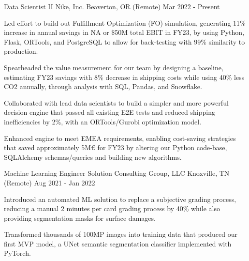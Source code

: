 


\begin{cventries}


\cventry
{Data Scientist II} %
{Nike, Inc.} %
{Beaverton, OR (Remote)} %
{Mar 2022 - Present} %
{ %
\begin{cvitems}
\item {
Led effort to build out Fulfillment Optimization (FO) simulation, generating 11\% increase in annual savings in NA or \$50M total EBIT in FY23, by using Python, Flask, ORTools, and PostgreSQL to allow for back-testing with 99\% similarity to production.
}
\item {
Spearheaded the value measurement for our team by designing a baseline, estimating FY23 savings with 8\% decrease in shipping costs while using 40\% less CO2 annually, through analysis with SQL, Pandas, and Snowflake.
}
\item {
Collaborated with lead data scientists to build a simpler and more powerful decision engine that passed all existing E2E tests and reduced shipping inefficiencies by 2\%, with an ORTools/Gurobi optimization model.
}
\item {
Enhanced engine to meet EMEA requirements, enabling cost-saving strategies that saved approximately 5M€ for FY23 by altering our Python code-base, SQLAlchemy schemas/queries and building new algorithms.
}
\end{cvitems}
}


\cventry
{Machine Learning Engineer} %
{Solution Consulting Group, LLC} %
{Knoxville, TN (Remote)} %
{Aug 2021 - Jan 2022} %
{ %
\begin{cvitems}
\item {Introduced an automated ML solution to replace a subjective grading process, reducing a manual 2 minutes per card grading process by 40\% while also providing segmentation masks for surface damages.}
\item {Transformed thousands of 100MP images into training data that produced our first MVP model, a UNet semantic segmentation classifier implemented with PyTorch.}
\end{cvitems}
}


\end{cventries}
